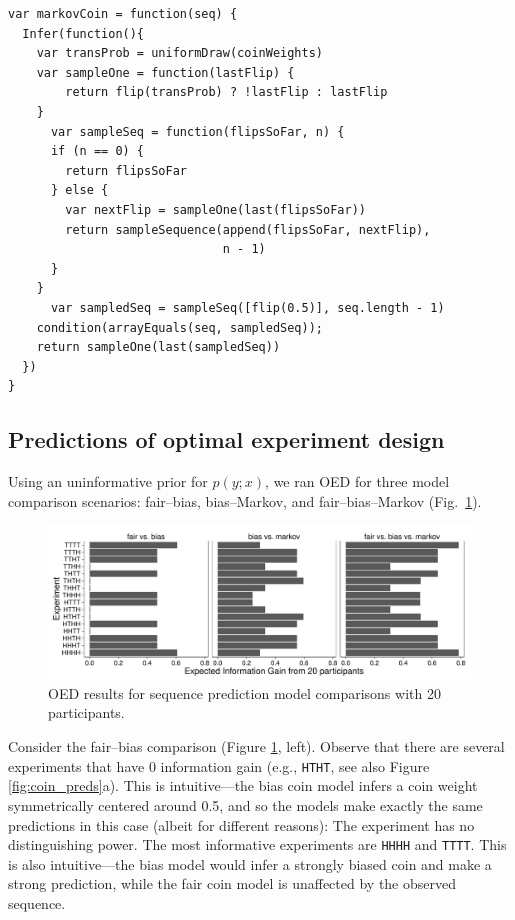 \documentclass{article}
\begin{document}
\begin{lstlisting}[upquote=true]
var markovCoin = function(seq) {
  Infer(function(){
    var transProb = uniformDraw(coinWeights)
    var sampleOne = function(lastFlip) {
        return flip(transProb) ? !lastFlip : lastFlip
    }
 	  var sampleSeq = function(flipsSoFar, n) {
      if (n == 0) {
        return flipsSoFar
      } else {
        var nextFlip = sampleOne(last(flipsSoFar))
        return sampleSequence(append(flipsSoFar, nextFlip),
                              n - 1)
      }
    }
	  var sampledSeq = sampleSeq([flip(0.5)], seq.length - 1)
    condition(arrayEquals(seq, sampledSeq));
    return sampleOne(last(sampledSeq))
  })
}
\end{lstlisting}

\subsection{Predictions of optimal experiment design}

Using an uninformative prior for $p(y; x)$, we ran OED for three model comparison scenarios: fair--bias, bias--Markov, and fair--bias--Markov (Fig.~\ref{fig:run-coin}).

\begin{figure}[h]
\includegraphics[width=\columnwidth]{img/coin_eig_n20_ignorance.pdf}
\caption{OED results for sequence prediction model comparisons with 20 participants.}
\label{fig:run-coin}
\end{figure}
Consider the fair--bias comparison (Figure \ref{fig:run-coin}, left).
Observe that there are several experiments that have 0 information gain (e.g., \lstinline{HTHT}, see also Figure \ref{fig:coin_preds}a).
This is intuitive---the bias coin model infers a coin weight symmetrically centered around 0.5, and so the models make exactly the same predictions in this case (albeit for different reasons): The experiment has no distinguishing power.
The most informative experiments are \lstinline{HHHH} and \lstinline{TTTT}.
This is also intuitive---the bias model would infer a strongly biased coin and make a strong prediction, while the fair coin model is unaffected by the observed sequence.
\end{document}
